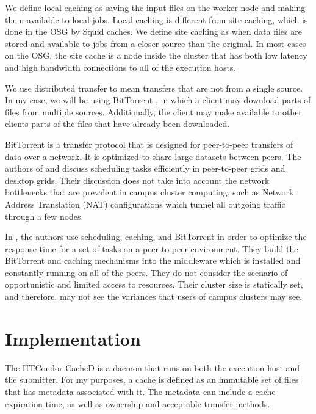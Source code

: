 
We define local caching as saving the input files on the worker node and making them available to local jobs.  Local caching is different from site caching, which is done in the OSG by Squid caches.  We define site caching as when data files are stored and available to jobs from a closer source than the original.  In most cases on the OSG, the site cache is a node inside the cluster that has both low latency and high bandwidth connections to all of the execution hosts.

We use distributed transfer to mean transfers that are not from a single source.  In my case, we will be using BitTorrent \cite{cohen2008BitTorrent}, in which a client may download parts of files from multiple sources.  Additionally, the client may make available to other clients parts of the files that have already been downloaded.

BitTorrent is a transfer protocol that is designed for peer-to-peer transfers of data over a network.  It is optimized to share large datasets between peers. The authors of \cite{wei2005scheduling} and \cite{wei2007towards} discuss scheduling tasks efficiently in peer-to-peer grids and desktop grids.  Their discussion does not take into account the network bottlenecks that are prevalent in campus cluster computing, such as Network Address Translation (NAT) configurations which tunnel all outgoing traffic through a few nodes.

In \cite{briquet2007scheduling}, the authors use scheduling, caching, and BitTorrent in order to optimize the response time for a set of tasks on a peer-to-peer environment.  They build the BitTorrent and caching mechanisms into the middleware which is installed and constantly running on all of the peers.  They do not consider the scenario of opportunistic and limited access to resources.  Their cluster size is statically set, and therefore, may not see the variances that users of campus clusters may see.



\section{Implementation}

The HTCondor CacheD is a daemon that runs on both the execution host and the submitter.  For my purposes, a cache is defined as an immutable set of files that has metadata associated with it.  The metadata can include a cache expiration time, as well as ownership and acceptable transfer methods.

